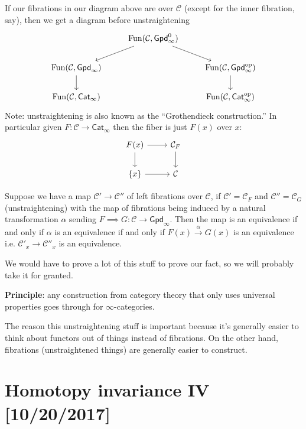 \documentclass{amsart}
\DeclareMathOperator{\Fun}{Fun}
\begin{document}
If our fibrations in our diagram above are over $\mathcal{C}$ (except for the inner fibration, say),
then we get a diagram before unstraightening
\begin{equation*}
    \begin{tikzcd}
        & \Fun(\mathcal{C}, \mathsf{Gpd}_\infty^0)\ar[ld]\ar[rd] &\\
        \Fun(\mathcal{C}, \mathsf{Gpd}_\infty)\dar  & & \Fun(\mathcal{C},\mathsf{Gpd}_\infty^\text{op})\dar \\
        \Fun(\mathcal{C},\mathsf{Cat}_\infty) & & \Fun(\mathcal{C}, \mathsf{Cat}_\infty^\text{op})
    \end{tikzcd}
\end{equation*}
Note: unstraightening is also known as the ``Grothendieck construction.''
In particular given $F:\mathcal{C}\to \mathsf{Cat}_\infty$ then the fiber is just $F(x)$ over $x$:
\begin{equation*}
    \begin{tikzcd}
        F(x) \rar\dar & \mathcal{C}_F\dar \\
        \{x\} \rar & \mathcal{C}
    \end{tikzcd}
\end{equation*}
\begin{corollary}
    Suppose we have a map $\mathcal{C}'\to \mathcal{C}''$ of left fibrations over $\mathcal{C}$, if 
    $\mathcal{C}'=\mathcal{C}_F$ and $\mathcal{C}''=\mathcal{C}_G$ (unstraightening) with
    the map of fibrations being induced by a natural transformation $\alpha$ sending $F\implies G:\mathcal{C}\to \mathsf{Gpd}_\infty$.
    Then the map is an equivalence if and only if $\alpha$ is an equivalence if and only if
    $F(x)\xrightarrow{\alpha}G(x)$ is an equivalence i.e. $\mathcal{C}'_x\to \mathcal{C}''_x$
    is an equivalence.
\end{corollary}
We would have to prove a lot of this stuff to prove our fact, so we will probably take
it for granted.

\textbf{Principle}: any construction from category theory that only uses universal properties
goes through for $\infty$-categories. 

The reason this unstraightening stuff is important because it's generally easier to
think about functors out of things instead of fibrations. On the other hand,
fibrations (unstraightened things) are generally easier to construct.

\newpage

\section{Homotopy invariance IV [10/20/2017]}



\appendix


\newpage




\end{document}
